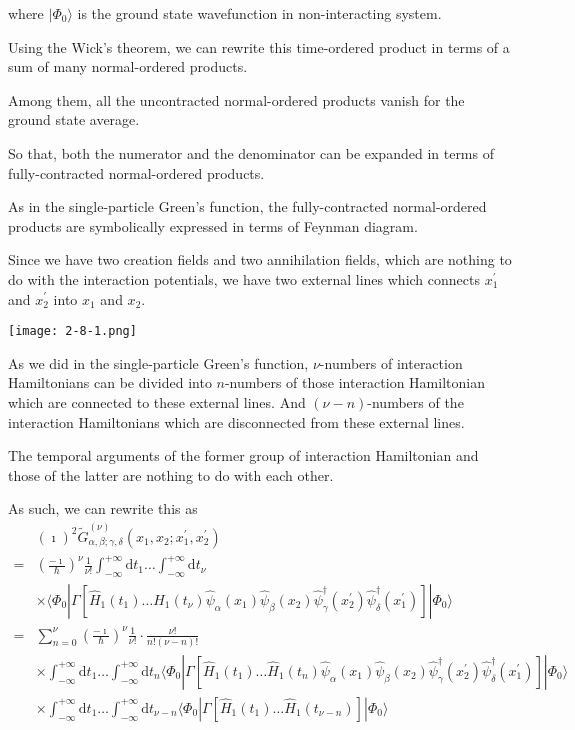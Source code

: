 where $| \Phi_0 \rangle$ is the ground state wavefunction in non-interacting system.

Using the Wick's theorem, we can rewrite this time-ordered product in terms of a sum of many normal-ordered products.

Among them, all the uncontracted normal-ordered products vanish for the ground state average.

So that, both the numerator and the denominator can be expanded in terms of fully-contracted normal-ordered products.

As in the single-particle Green's function, the fully-contracted normal-ordered products are symbolically expressed in terms of Feynman diagram.

Since we have two creation fields and two annihilation fields, which are nothing to do with the interaction potentials, we have two external lines which connects $x_1^{'}$ and $x_2^{'}$ into $x_1$ and $x_2$.
\begin{center} \label{Fig2.8.1}
\texttt{[image: 2-8-1.png]}
\end{center}

As we did in the single-particle Green's function, $\nu$-numbers of interaction Hamiltonians can be divided into $n$-numbers of those interaction Hamiltonian which are connected to these external lines. And $(\nu-n)$-numbers of the interaction Hamiltonians which are disconnected from these external lines.

The temporal arguments of the former group of interaction Hamiltonian and those of the latter are nothing to do with each other.

As such, we can rewrite this as
\[ \begin{split} &(\imath)^2\tilde{G}^{(\nu)}_{\alpha,\beta;\gamma,\delta}(x_1,x_2;x_1^{'},x_2^{'})\\
 =& \left( \frac{-\imath}{\hbar} \right)^\nu \frac{1}{\nu!} \int_{-\infty}^{+\infty}\mathrm{d}t_1 \ldots \int_{-\infty}^{+\infty}\mathrm{d}t_\nu \\
&\times \langle \Phi_0 | \Gamma[\hat{H}_1(t_1)\ldots\hat{H}_1(t_\nu)\hat{\psi}_\alpha(x_1) \hat{\psi}_\beta(x_2) \hat{\psi}_\gamma^\dagger(x_2^{'}) \hat{\psi}_\delta^\dagger(x_1^{'})]|\Phi_0\rangle\\
=& \sum_{n=0}^{\nu}\left( \frac{-\imath}{\hbar} \right)^\nu \frac{1}{\nu!}\cdot\frac{\nu!}{n!(\nu-n)!}\\
&\times\int_{-\infty}^{+\infty}\mathrm{d}t_1 \ldots \int_{-\infty}^{+\infty}\mathrm{d}t_n
\langle \Phi_0 | \Gamma[\hat{H}_1(t_1)\ldots\hat{H}_1(t_n)\hat{\psi}_\alpha(x_1) \hat{\psi}_\beta(x_2) \hat{\psi}_\gamma^\dagger(x_2^{'}) \hat{\psi}_\delta^\dagger(x_1^{'})]|\Phi_0\rangle\\
&\times\int_{-\infty}^{+\infty}\mathrm{d}t_1 \ldots \int_{-\infty}^{+\infty}\mathrm{d}t_{\nu-n}
\langle \Phi_0 | \Gamma[\hat{H}_1(t_1)\ldots\hat{H}_1(t_{\nu-n})]|\Phi_0\rangle
\end{split} \]

